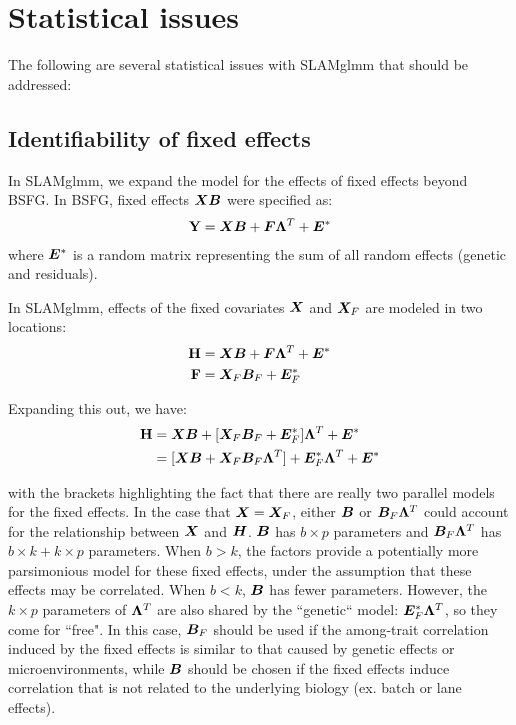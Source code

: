 \documentclass[11pt]{amsart}
\newcommand*{\B}[1]{\ifmmode\bm{#1}\else\textbf{#1}\fi}
\begin{document}
\section{Statistical issues}
The following are several statistical issues with SLAMglmm that should be addressed:

\subsection{Identifiability of fixed effects}
In SLAMglmm, we expand the model for the effects of fixed effects beyond BSFG. In BSFG, fixed effects $\B{XB}$ were specified as:
\begin{align*}
\B{Y} = \B{X}\B{B} + \B{F}\B{\Lambda}^T + \B{E}^*
\end{align*}
\noindent where $\B{E}^*$ is a random matrix representing the sum of all random effects (genetic and residuals).

In SLAMglmm, effects of the fixed covariates $\B{X}$ and $\B{X}_F$ are modeled in two locations:
\begin{align*}
\B{H} &= \B{X}\B{B} + \B{F}\B{\Lambda}^T + \B{E}^* \\
\B{F} &= \B{X}_F\B{B}_F + \B{E}^*_F
\end{align*}

Expanding this out, we have:
\begin{align*}
\B{H} &= \B{X}\B{B} + [\B{X}_F\B{B}_F + \B{E}^*_F]\B{\Lambda}^T + \B{E}^* \\
&= [\B{X}\B{B} + \B{X}_F\B{B}_F\B{\Lambda}^T] + \B{E}^*_F\B{\Lambda}^T + \B{E}^* 
\end{align*}

\noindent with the brackets highlighting the fact that there are really two parallel models for the fixed effects. In the case that $\B{X} = \B{X}_F$, either $\B{B}$ or $\B{B}_F\B{\Lambda}^T$ could account for the relationship between $\B{X}$ and $\B{H}$. $\B{B}$ has $b \times p$ parameters and $\B{B}_F\B{\Lambda}^T$ has $b \times k + k \times p$ parameters. When $b > k$, the factors provide a potentially more parsimonious model for these fixed effects, under the assumption that these effects may be correlated. When $b < k$, $\B{B}$ has fewer parameters. However, the $k \times p$ parameters of $\B{\Lambda}^T$ are also shared by the ``genetic`` model: $\B{E}^*_F\B{\Lambda}^T$, so they come for ``free". In this case, $\B{B}_F$ should be used if the among-trait correlation induced by the fixed effects is similar to that caused by genetic effects or microenvironments, while $\B{B}$ should be chosen if the fixed effects induce correlation that is not related to the underlying biology (ex. batch or lane effects).
\end{document}
